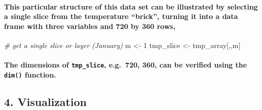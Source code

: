 \documentclass[]{article}
\newenvironment{Shaded}{\begin{snugshade}}{\end{snugshade}}
\newcommand{\DecValTok}[1]{\textcolor[rgb]{0.00,0.00,0.81}{#1}}
\newcommand{\StringTok}[1]{\textcolor[rgb]{0.31,0.60,0.02}{#1}}
\newcommand{\CommentTok}[1]{\textcolor[rgb]{0.56,0.35,0.01}{\textit{#1}}}
\newcommand{\NormalTok}[1]{#1}
\let\oldparagraph\paragraph
\renewcommand{\paragraph}[1]{\oldparagraph{#1}\mbox{}}
\begin{document}
\paragraph{\texorpdfstring{This particular structure of this data set
can be illustrated by selecting a single slice from the temperature
``brick'', turning it into a data frame with three variables and 720 by
360
rows,}{This particular structure of this data set can be illustrated by selecting a single slice from the temperature brick, turning it into a data frame with three variables and 720 by 360 rows,}}\label{this-particular-structure-of-this-data-set-can-be-illustrated-by-selecting-a-single-slice-from-the-temperature-brick-turning-it-into-a-data-frame-with-three-variables-and-720-by-360-rows}

\begin{Shaded}
\begin{Highlighting}[]
\CommentTok{# get a single slice or layer (January)}
\NormalTok{m <-}\StringTok{ }\DecValTok{1}
\NormalTok{tmp_slice <-}\StringTok{ }\NormalTok{tmp_array[,,m]}
\end{Highlighting}
\end{Shaded}

\paragraph{\texorpdfstring{The dimensions of \texttt{tmp\_slice},
e.g.~720, 360, can be verified using the \texttt{dim()}
function.}{The dimensions of tmp\_slice, e.g.~720, 360, can be verified using the dim() function.}}\label{the-dimensions-of-tmp_slice-e.g.720-360-can-be-verified-using-the-dim-function.}

\subsection{4. Visualization}\label{visualization}
\end{document}
